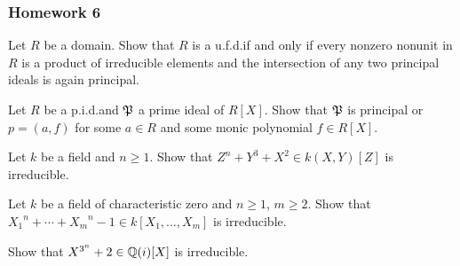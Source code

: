\subsubsection{Homework 6}
\setcounter{exercise}{0}
\setcounter{equation}{0}

\begin{problem}
  Let $R$ be a domain. Show that $R$ is a u.f.d.\@ if and only if every
  nonzero nonunit in $R$ is a product of irreducible elements and the
  intersection of any two principal ideals is again principal.
\end{problem}
\begin{solution}
\end{solution}

\begin{problem}
  Let $R$ be a p.i.d.\@ and $\mathfrak{P}$ a prime ideal of $R[X]$. Show that
  $\mathfrak{P}$ is principal or $p=(a,f)$ for some $a\in R$ and some monic
  polynomial $f\in R[X]$.
\end{problem}
\begin{solution}
\end{solution}

\begin{problem}
  Let $k$ be a field and $n\geq 1$. Show that $Z^n+Y^3+X^2\in k(X,Y)[Z]$ is
  irreducible.
\end{problem}
\begin{solution}
\end{solution}

\begin{problem}
  Let $k$ be a field of characteristic zero and $n\geq 1$, $m\geq 2$. Show
  that ${X_1}^n+\dotsb+{X_m}^n-1\in k[X_1,\dotsc,X_m]$ is irreducible.
\end{problem}
\begin{solution}
\end{solution}

\begin{problem}
  Show that $X^{3^n}+2\in\mathbb{Q}(i)[X]$ is irreducible.
\end{problem}
\begin{solution}
\end{solution}

